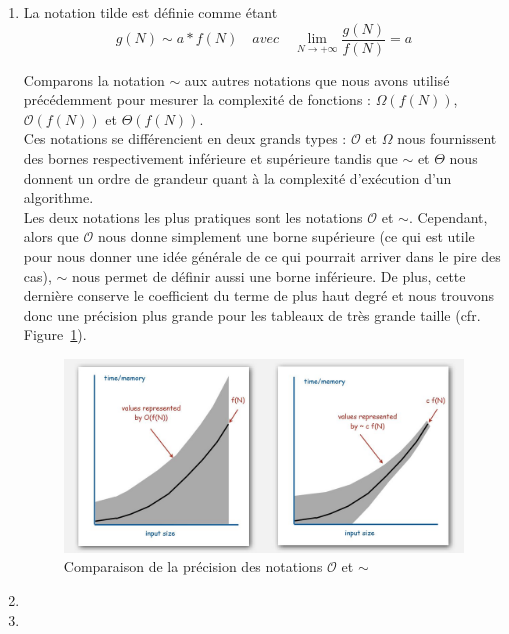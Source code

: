 \begin{enumerate}
	\item

La notation tilde est définie comme étant\cite{tilde-pdf}  $$g(N) \sim a * f(N) \quad avec \quad \lim\limits_{N \longrightarrow +\infty} \frac{g(N)}{f(N)} = a$$

	Comparons la notation $\sim$ aux autres notations que nous avons utilisé précédemment pour mesurer la complexité de fonctions :
	 $\Omega(f(N))$, $\mathcal{O}(f(N))$ et $\Theta(f(N))$. \\
	Ces notations se différencient en deux grands types : $\mathcal{O}$ et $\Omega$ nous fournissent des bornes respectivement inférieure et supérieure tandis que $\sim$ et $\Theta$ nous donnent un ordre de grandeur quant à la complexité d'exécution d'un algorithme.\\
	Les deux notations les plus pratiques sont les notations $\mathcal{O}$ et $\sim$.	Cependant, alors que $\mathcal{O}$ nous donne simplement une borne supérieure (ce qui est utile pour nous donner une idée générale de ce qui pourrait arriver dans le pire des cas), $\sim$ nous permet de définir aussi une borne inférieure. De plus, cette dernière conserve le coefficient du terme de plus haut degré et nous trouvons donc une précision plus grande pour les tableaux de très grande taille (cfr. Figure~\ref{complex_tilde}).
\begin{figure}[h]
	\includegraphics[width=\textwidth]{complex_tilde.jpg}
	\caption{Comparaison de la précision des notations $\mathcal{O}$ et $\sim$ \cite{image-complex}}
	\label{complex_tilde}
\end{figure}	

	\item
	\item
\end{enumerate}




